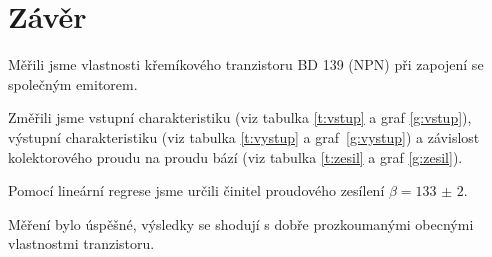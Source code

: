 \section*{Závěr}
Měřili jsme vlastnosti křemíkového tranzistoru BD 139 (NPN) při zapojení se společným emitorem.


Změřili jsme vstupní charakteristiku (viz tabulka \ref{t:vstup} a graf \ref{g:vstup}), výstupní charakteristiku (viz tabulka \ref{t:vystup} a graf~\ref{g:vystup}) a závislost kolektorového proudu na proudu bází (viz tabulka \ref{t:zesil} a graf \ref{g:zesil}).

Pomocí lineární regrese jsme určili činitel proudového zesílení $\beta = \num[separate-uncertainty=true]{133(2)}$.

Měření bylo úspěšné, výsledky se shodují s dobře prozkoumanými obecnými vlastnostmi tranzistoru.